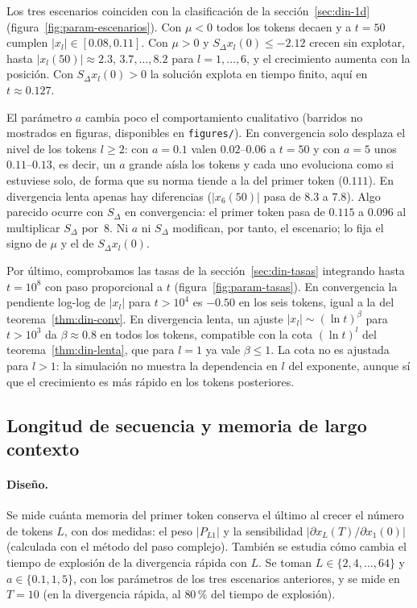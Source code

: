Los tres escenarios coinciden con la clasificación de la sección~\ref{sec:din-1d} (figura~\ref{fig:param-escenarios}). Con $\mu<0$ todos los tokens decaen y a $t=50$ cumplen $\lvert x_l\rvert\in[0.08,0.11]$. Con $\mu>0$ y $S_\Delta x_l(0)\le-2.12$ crecen sin explotar, hasta $\lvert x_l(50)\rvert\approx 2.3,\,3.7,\dots,8.2$ para $l=1,\dots,6$, y el crecimiento aumenta con la posición. Con $S_\Delta x_l(0)>0$ la solución explota en tiempo finito, aquí en $t\approx0.127$.

El parámetro $a$ cambia poco el comportamiento cualitativo (barridos no mostrados en figuras, disponibles en \texttt{figures/}). En convergencia solo desplaza el nivel de los tokens $l\ge2$: con $a=0.1$ valen $0.02$--$0.06$ a $t=50$ y con $a=5$ unos $0.11$--$0.13$, es decir, un $a$ grande aísla los tokens y cada uno evoluciona como si estuviese solo, de forma que su norma tiende a la del primer token ($0.111$). En divergencia lenta apenas hay diferencias ($\lvert x_6(50)\rvert$ pasa de $8.3$ a $7.8$). Algo parecido ocurre con $S_\Delta$ en convergencia: el primer token pasa de $0.115$ a $0.096$ al multiplicar $S_\Delta$ por~8. Ni $a$ ni $S_\Delta$ modifican, por tanto, el escenario; lo fija el signo de $\mu$ y el de $S_\Delta x_l(0)$.

Por último, comprobamos las tasas de la sección~\ref{sec:din-tasas} integrando hasta $t=10^8$ con paso proporcional a $t$ (figura~\ref{fig:param-tasas}). En convergencia la pendiente log-log de $\lvert x_l\rvert$ para $t>10^4$ es $-0.50$ en los seis tokens, igual a la del teorema~\ref{thm:din-conv}. En divergencia lenta, un ajuste $\lvert x_l\rvert\sim(\ln t)^{\beta}$ para $t>10^3$ da $\beta\approx0.8$ en todos los tokens, compatible con la cota $(\ln t)^l$ del teorema~\ref{thm:din-lenta}, que para $l=1$ ya vale $\beta\le1$. La cota no es ajustada para $l>1$: la simulación no muestra la dependencia en $l$ del exponente, aunque sí que el crecimiento es más rápido en los tokens posteriores.

\subsection{Longitud de secuencia y memoria de largo contexto}
\label{sec:sim-long}

\paragraph{Diseño.}
Se mide cuánta memoria del primer token conserva el último al crecer el número de tokens $L$, con dos medidas: el peso $\lvert P_{L1}\rvert$ y la sensibilidad $\lvert\partial x_L(T)/\partial x_1(0)\rvert$ (calculada con el método del paso complejo).
También se estudia cómo cambia el tiempo de explosión de la divergencia rápida con $L$. Se toman $L\in\{2,4,\dots,64\}$ y $a\in\{0.1,1,5\}$, con los parámetros de los tres escenarios anteriores, y se mide en $T=10$ (en la divergencia rápida, al $80\,\%$ del tiempo de explosión).

